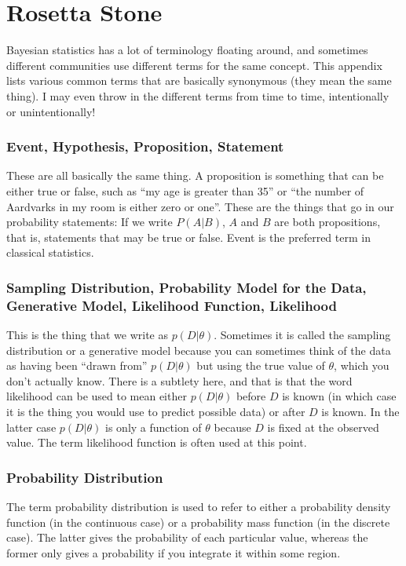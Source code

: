 \chapter{Rosetta Stone}
Bayesian statistics has a lot of terminology floating around, and sometimes
different communities use different terms for the same concept. This appendix
lists various common terms that are basically synonymous (they mean the same thing).
I may even throw in the different terms from time to time, intentionally or
unintentionally!

\subsection*{Event, Hypothesis, Proposition, Statement}
These are all basically the same thing.
A proposition is something that can be either true or false, such as ``my age is
greater than 35'' or ``the number of Aardvarks in my room is either zero or
one''. These are the things that go in our
probability statements: If we write $P(A|B)$, $A$ and $B$ are both propositions,
that is, statements that may be true or false. Event is the preferred term in
classical statistics.


\subsection*{Sampling Distribution, Probability Model for the Data,
Generative Model, Likelihood Function, Likelihood}
This is the thing that we
write as $p(D|\theta)$. Sometimes it is called the sampling distribution or
a generative model because
you can sometimes think of the data as having been ``drawn from''
$p(D|\theta)$ but using the true value of $\theta$, which you don't actually
know. There is a subtlety here, and that is that the word likelihood can be
used to mean either $p(D|\theta)$ before $D$ is known (in which case it is the
thing you would use to predict possible data) or after $D$ is known. In the latter
case $p(D|\theta)$ is only a function of $\theta$ because $D$ is fixed at the
observed value. The term likelihood function is often used at this point.

\subsection*{Probability Distribution}
The term probability distribution is used to refer to either a probability density
function (in the continuous case) or a probability mass function (in the discrete
case). The latter gives the probability of each particular value, whereas the
former only gives a probability if you integrate it within some region.

